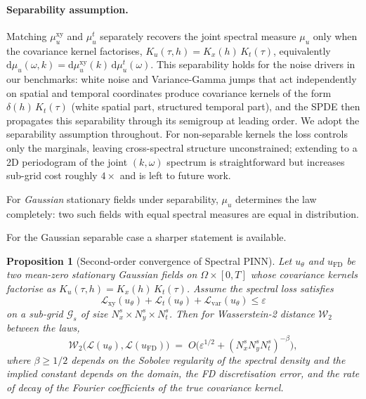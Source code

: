 \documentclass[review,12pt]{elsarticle}
\newtheorem{proposition}{Proposition}
\begin{document}
\paragraph{Separability assumption.}
Matching \(\mu^{\mathrm{xy}}_u\) and \(\mu^t_u\) separately
recovers the joint spectral measure \(\mu_u\) only when the
covariance kernel factorises, \(K_u(\tau, h) = K_x(h)\, K_t(\tau)\),
equivalently \(\mathrm d\mu_u(\omega, k) = \mathrm d\mu^{\mathrm{xy}}_u(k)\,
\mathrm d\mu^t_u(\omega)\). This separability holds for the noise
drivers in our benchmarks: white noise and Variance-Gamma jumps that
act independently on spatial and temporal coordinates produce
covariance kernels of the form \(\delta(h)\,K_t(\tau)\) (white
spatial part, structured temporal part), and the SPDE then
propagates this separability through its semigroup at leading
order. We adopt the separability assumption throughout. For
non-separable kernels the loss controls only the marginals,
leaving cross-spectral structure unconstrained; extending to a 2D
periodogram of the joint \((k, \omega)\) spectrum is straightforward
but increases sub-grid cost roughly \(4\times\) and is left to
future work.

For \emph{Gaussian} stationary fields under separability,
\(\mu_u\) determines the law completely: two such fields with
equal spectral measures are equal in distribution.


For the Gaussian separable case a sharper statement is available.

\begin{proposition}[Second-order convergence of Spectral PINN]
\label{prop:gaussian-convergence}
Let \(u_\theta\) and \(u_{\mathrm{FD}}\) be two mean-zero stationary
Gaussian fields on \(\Omega \times [0,T]\) whose covariance kernels
factorise as \(K_u(\tau, h) = K_x(h)\, K_t(\tau)\). Assume the
spectral loss satisfies
\[
\mathcal{L}_{\mathrm{xy}}(u_\theta) + \mathcal{L}_{t}(u_\theta) +
\mathcal{L}_{\mathrm{var}}(u_\theta) \leq \varepsilon
\]
on a sub-grid \(\mathcal{G}_s\) of size \(N_x^s \times N_y^s \times N_t^s\).
Then for Wasserstein-2 distance \(\mathcal{W}_2\) between the laws,
\[
\mathcal{W}_2\bigl(\mathcal{L}(u_\theta), \mathcal{L}(u_{\mathrm{FD}})\bigr)
\;=\; O\bigl(\varepsilon^{1/2} + (N_x^s N_y^s N_t^s)^{-\beta}\bigr),
\]
where \(\beta \geq 1/2\) depends on the Sobolev regularity of the
spectral density and the implied constant depends on the domain,
the FD discretisation error, and the rate of decay of the
Fourier coefficients of the true covariance kernel.
\end{proposition}
\end{document}
